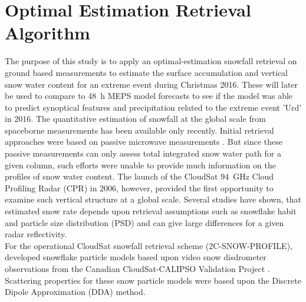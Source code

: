 \section{Optimal Estimation Retrieval Algorithm} %
\label{sec:retrieval}
The purpose of this study is to apply an optimal-estimation snowfall retrieval on ground based measurements to estimate the surface accumulation and vertical snow water content for an extreme event during Christmas 2016. These will later be used to compare to \SI{48}{\hour} MEPS model forecasts to see if the model was able to predict synoptical features and precipitation related to the extreme event 'Urd' in 2016. 
The quantitative estimation of snowfall at the global scale from spaceborne measurements has been available only recently. Initial retrieval approaches were based on passive microwave measurements \citep{skofronick-jackson_physical_2004,noh_development_2006}. But since these passive measurements can only assess total integrated snow water path for a given column, such efforts were unable to provide much information on the profiles of snow water content. 
The launch of the CloudSat \SI{94}{\giga\hertz} Cloud Profiling Radar (CPR) in 2006, however, provided the first opportunity to examine such vertical structure at a global scale. 
Several studies have shown, that estimated snow rate depends upon retrieval assumptions such as snowflake habit and particle size distribution (PSD) and can give large differences for a given radar reflectivity.
\\
For the operational CloudSat snowfall retrieval scheme (2C-SNOW-PROFILE), \citet{wood_microphysical_2015} developed snowflake particle models based upon video snow disdrometer observations from the Canadian CloudSat-CALIPSO Validation Project \citep[C3VP,][]{hudak_canadian_2006}. Scattering properties for these snow particle models were based upon the Discrete Dipole Approximation (DDA) method. 
